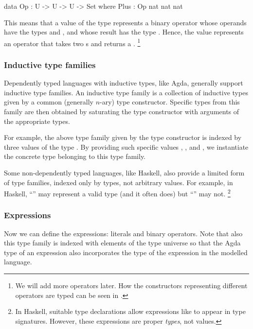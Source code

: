 \begin{code}
  data Op : U -> U -> U -> Set where
    Plus : Op nat nat nat
\end{code}

\noindent This means that a value of the type  represents
a binary operator whose operands have the types  and ,
and whose result has the type . Hence, the value 
represents an operator that takes two s and returns a .%
\footnote{We will add more operators later. How the constructors representing
different operators are typed can be seen in .}

\subsubsection{Inductive type families}

Dependently typed languages with inductive types, like Agda, generally support inductive
type families. An inductive type family is a collection of inductive types given by
a common (generally $n$-ary) type constructor. Specific types from this family are then obtained
by saturating the type constructor with arguments of the appropriate types.

For example, the above type family given by the type constructor  is indexed
by three values of the type . By providing such specific values , ,
and , we instantiate the concrete type  belonging to this type family.

Some non-dependently typed languages, like Haskell, also provide a limited form of
type families, indexed only by types, not arbitrary values. For example, in Haskell,
``'' may represent a valid type (and it often does) but
``'' may not.%
\footnote{In Haskell, suitable type declarations allow expressions like 
to appear in type signatures. However, these expressions are proper \emph{types}, not values.}

\subsubsection{Expressions}

Now we can define the expressions: literals and binary operators.
Note that also this type family is indexed with elements of the type universe
 so that the Agda type of an expression also incorporates the type of
the expression in the modelled language.

